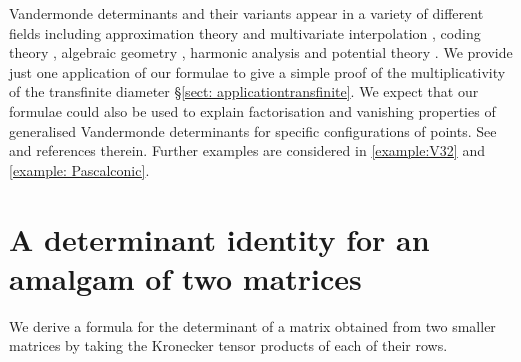 \documentclass[10pt]{amsart}
\theoremstyle{definition}
\theoremstyle{remark}
\numberwithin{equation}{section}
\newcommand{\0}{\color{blue}{\mathsf{0}}}
\begin{document}
Vandermonde determinants and their variants appear in a variety of different fields including approximation theory and multivariate interpolation \cite{Olver}, coding theory \cite{ToricVdM}, algebraic geometry \cite{TropicalVdM},  harmonic analysis \cite{ClusteredNodesVdM} and potential theory \cite{BloomLevenberg}.  We provide just one application  of our formulae  to give a simple proof of the multiplicativity of the transfinite diameter \S\ref{sect: applicationtransfinite}. 
We  expect that our formulae could also be used to explain factorisation and vanishing properties of generalised Vandermonde determinants for specific configurations  of points.  See \cite{SeparateVdM} and references therein. Further examples are considered in \ref{example:V32} and \ref{example: Pascalconic}.  

\section{A determinant identity for an amalgam of two matrices} \label{sect: IdentityAstarB} 
We derive a formula for the determinant of a matrix obtained from two smaller matrices by taking the Kronecker tensor products of each of their rows.
\end{document}
